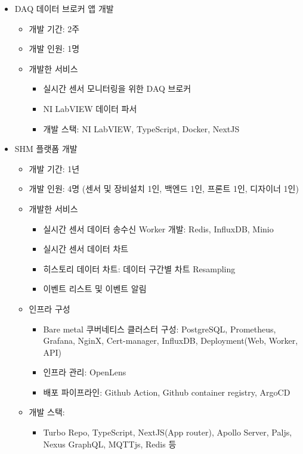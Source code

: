 
\begin{itemize}
	\item DAQ 데이터 브로커 앱 개발
	      \begin{itemize}[label=$\star$]
		      \item 개발 기간: 2주
		      \item 개발 인원: 1명
		      \item 개발한 서비스
		            \begin{itemize}
			            \item 실시간 센서 모니터링을 위한 DAQ 브로커
			            \item NI LabVIEW 데이터 파서
			            \item 개발 스택: NI LabVIEW, TypeScript, Docker, NextJS
		            \end{itemize}
	      \end{itemize}
	\item SHM 플랫폼 개발
	      \begin{itemize}[label=$\star$]
		      \item 개발 기간: 1년
		      \item 개발 인원: 4명 (센서 및 장비설치 1인, 백엔드 1인, 프론트 1인, 디자이너 1인)
		      \item 개발한 서비스
		            \begin{itemize}
			            \item 실시간 센서 데이터 송수신 Worker 개발: Redis, InfluxDB, Minio
			            \item 실시간 센서 데이터 차트
			            \item 히스토리 데이터 차트: 데이터 구간별 차트 Resampling
			            \item 이벤트 리스트 및 이벤트 알림
		            \end{itemize}
		      \item 인프라 구성
		            \begin{itemize}
			            \item Bare metal 쿠버네티스 클러스터 구성: PostgreSQL, Prometheus, Grafana, NginX, Cert-manager, InfluxDB, Deployment(Web, Worker, API)
			            \item 인프라 관리: OpenLens
			            \item 배포 파이프라인: Github Action, Github container registry, ArgoCD
		            \end{itemize}
		      \item 개발 스택:
		            \begin{itemize}
			            \item Turbo Repo, TypeScript, NextJS(App router), Apollo Server, Paljs, Nexus GraphQL, MQTTjs, Redis 등
		            \end{itemize}
	      \end{itemize}
\end{itemize}
